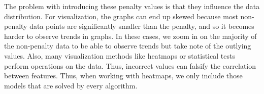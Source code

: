 The problem with introducing these penalty values is that they influence the data distribution.
For visualization, the graphs can end up skewed because most non-penalty data points are significantly smaller than the penalty, 
and so it becomes harder to observe trends in graphs. In these cases, we zoom in on the majority of the non-penalty data to be able to observe trends
but take note of the outlying values.
Also, many visualization methods like heatmaps or statistical tests perform operations on the
data. Thus, incorrect values can falsify the correlation between features. 
Thus, when working with heatmaps, we only include those models that are solved by every algorithm.